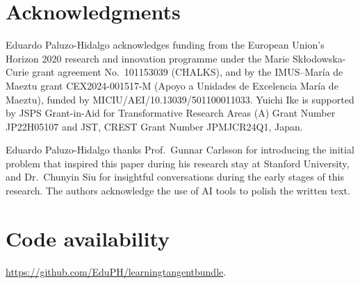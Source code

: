\documentclass[11pt]{article}
\theoremstyle{plain}
\theoremstyle{definition}
\theoremstyle{remark}
\begin{document}
\section*{Acknowledgments}
Eduardo Paluzo-Hidalgo acknowledges funding from the European Union's Horizon 2020 research and innovation programme under the Marie Sk\l{}odowska-Curie grant agreement No.\ 101153039 (CHALKS), and by the IMUS--Mar\'ia de Maeztu grant CEX2024-001517-M (Apoyo a Unidades de Excelencia Mar\'ia de Maeztu), funded by MICIU/AEI/10.13039/501100011033.
Yuichi Ike is supported by JSPS Grant-in-Aid for Transformative Research Areas (A) Grant Number JP22H05107 and JST, CREST Grant Number JPMJCR24Q1, Japan.

Eduardo Paluzo-Hidalgo thanks Prof.\ Gunnar Carlsson for introducing the initial problem that inspired this paper during his research stay at Stanford University, and Dr.\ Chunyin Siu for insightful conversations during the early stages of this research. The authors acknowledge the use of AI tools to polish the written text.

\section*{Code availability}
\url{https://github.com/EduPH/learningtangentbundle}.








\end{document}
